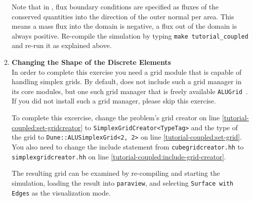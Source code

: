 \begin{enumerate}
  Note that in \eWoms, flux boundary conditions are specified as
  fluxes of the conserved quantities into the direction of the outer
  normal per area. This means a mass flux into the domain is negative,
  a flux out of the domain is always positive. Re-compile the
  simulation by typing \texttt{make tutorial\_coupled} and re-run it
  as explained above.

\item \textbf{Changing  the Shape of the Discrete Elements} \\
  In order to complete this exercise you need a \Dune grid module that
  is capable of handling simplex grids. By default, \Dune does not
  include such a grid manager in its core modules, but one such grid
  manager that is freely available
  \texttt{ALUGrid}~\cite{ALUGRID-HP}. If you did not install such a
  grid manager, please skip this exercise.  

  To complete this excercise, change the problem's grid creator on
  line \ref{tutorial-coupled:set-gridcreator} to
  \texttt{SimplexGridCreator<TypeTag>} and the type of the grid to
  \texttt{Dune::ALUSimplexGrid<2, 2>} on line
  \ref{tutorial-coupled:set-grid}. You also need to change the include
  statement from \texttt{cubegridcreator.hh} to
  \texttt{simplexgridcreator.hh} on line
  \ref{tutorial-coupled:include-grid-creator}.

  The resulting grid can be examined by re-compiling and starting the
  simulation, loading the result into \texttt{paraview}, and selecting
  \texttt{Surface with Edges} as the visualization mode.


\end{enumerate}
